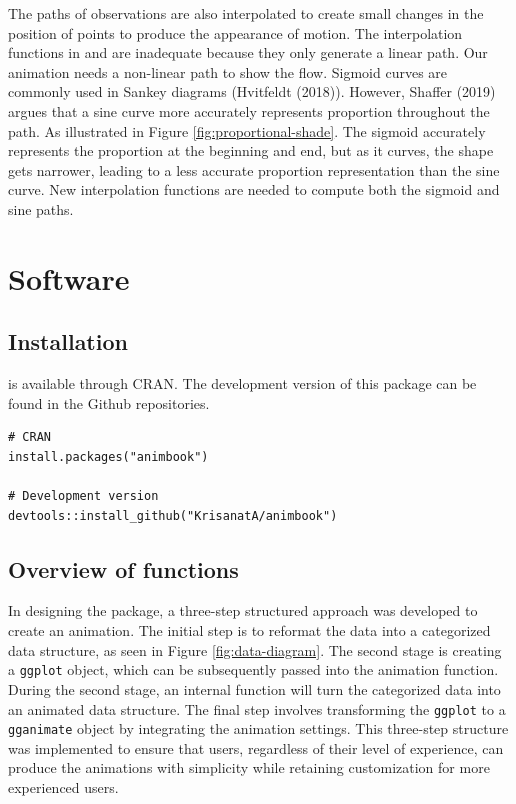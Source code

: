 The paths of observations are also interpolated to create small changes in the position of points to produce the appearance of motion. The interpolation functions in  and  are inadequate because they only generate a linear path. Our animation needs a non-linear path to show the flow. Sigmoid curves are commonly used in Sankey diagrams (Hvitfeldt (2018)). However, Shaffer (2019) argues that a sine curve more accurately represents proportion throughout the path. As illustrated in Figure \ref{fig:proportional-shade}. The sigmoid accurately represents the proportion at the beginning and end, but as it curves, the shape gets narrower, leading to a less accurate proportion representation than the sine curve. New interpolation functions are needed to compute both the sigmoid and sine paths.

\hypertarget{software}{%
\section{Software}\label{software}}

\hypertarget{installation}{%
\subsection{Installation}\label{installation}}

 is available through CRAN. The development version of this package can be found in the Github repositories.

\begin{verbatim}
# CRAN
install.packages("animbook")

# Development version
devtools::install_github("KrisanatA/animbook")
\end{verbatim}

\hypertarget{overview-of-functions}{%
\subsection{Overview of functions}\label{overview-of-functions}}

In designing the  package, a three-step structured approach was developed to create an animation. The initial step is to reformat the data into a categorized data structure, as seen in Figure \ref{fig:data-diagram}. The second stage is creating a \texttt{ggplot} object, which can be subsequently passed into the animation function. During the second stage, an internal function will turn the categorized data into an animated data structure. The final step involves transforming the \texttt{ggplot} to a \texttt{gganimate} object by integrating the animation settings. This three-step structure was implemented to ensure that users, regardless of their level of experience, can produce the animations with simplicity while retaining customization for more experienced users.

